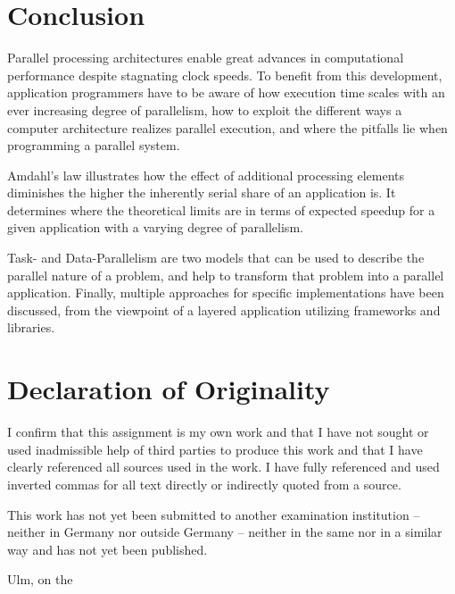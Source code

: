 \documentclass[BCOR20mm,DIV14,10pt,headinclude,footexclude,bibtotoc,liststotoc]{article}
\begin{document}
\section{Conclusion}
Parallel processing architectures enable great advances in computational
performance despite stagnating clock speeds. To benefit from this development,
application programmers have to be aware of how execution time scales with an
ever increasing degree of parallelism, how to exploit the different ways a
computer architecture realizes parallel execution, and where the pitfalls lie
when programming a parallel system.

Amdahl's law illustrates how the effect of additional processing elements
diminishes the higher the inherently serial share of an application is. It
determines where the theoretical limits are in terms of expected speedup for a
given application with a varying degree of parallelism.

Task- and Data-Parallelism are two models that can be used to describe the
parallel nature of a problem, and help to transform that problem into a parallel
application. Finally, multiple approaches for specific implementations have been
discussed, from the viewpoint of a layered application utilizing frameworks and
libraries.

\newpage




\cleardoublepage
\section*{Declaration of Originality}

I confirm that this assignment is my own work and that I have not sought or used
inadmissible help of third parties to produce this work and that I have clearly
referenced all sources used in the work. I have fully referenced and used
inverted commas for all text directly or indirectly quoted from a source.

This work has not yet been submitted to another examination institution –
neither in Germany nor outside Germany – neither in the same nor in a similar
way and has not yet been published.

\vspace{2cm}

Ulm, on the \dotfill

\hspace{10cm} {\footnotesize \theauthor}
\end{document}
